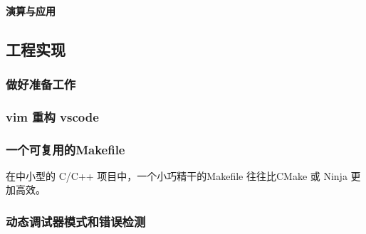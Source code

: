 \hypertarget{ux6f14ux7b97ux4e0eux5e94ux7528}{%
\paragraph{演算与应用}\label{ux6f14ux7b97ux4e0eux5e94ux7528}}

\hypertarget{ux5de5ux7a0bux5b9eux73b0}{%
\subsection{工程实现}\label{ux5de5ux7a0bux5b9eux73b0}}

\hypertarget{ux505aux597dux51c6ux5907ux5de5ux4f5c}{%
\subsubsection{做好准备工作}\label{ux505aux597dux51c6ux5907ux5de5ux4f5c}}

\hypertarget{vim-ux91cdux6784-vscode}{%
\subsubsection{vim 重构 vscode}\label{vim-ux91cdux6784-vscode}}

\hypertarget{ux4e00ux4e2aux53efux590dux7528ux7684makefile}{%
\subsubsection{一个可复用的Makefile}\label{ux4e00ux4e2aux53efux590dux7528ux7684makefile}}

在中小型的 C/C++ 项目中，一个小巧精干的Makefile 往往比CMake 或 Ninja
更加高效。

\begin{Shaded}
\begin{Highlighting}[]
\CharTok{=}\StringTok{ }\CharTok{$(}\CharTok{)}
\CharTok{=}\StringTok{ }\CharTok{$(}\CharTok{)}
\CharTok{=}\StringTok{ }\CharTok{$(}\KeywordTok{:}\KeywordTok{=}\CharTok{)}
\end{Highlighting}
\end{Shaded}

\hypertarget{ux52a8ux6001ux8c03ux8bd5ux5668ux6a21ux5f0fux548cux9519ux8befux68c0ux6d4b}{%
\subsubsection{动态调试器模式和错误检测}\label{ux52a8ux6001ux8c03ux8bd5ux5668ux6a21ux5f0fux548cux9519ux8befux68c0ux6d4b}}

